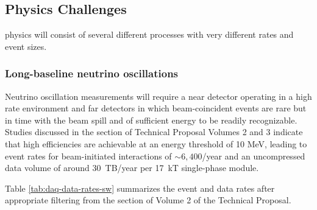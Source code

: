 
\subsection{Physics Challenges}

  physics will consist of several different processes with very different rates and event sizes. 


\subsubsection{Long-baseline neutrino oscillations} Neutrino oscillation measurements will require a near detector operating in a high rate environment and far detectors in which beam-coincident events are rare but in time with the beam spill and of sufficient energy to be readily recognizable.  Studies discussed in the  section of  Technical Proposal Volumes 2 and 3 indicate that high efficiencies are achievable at an energy threshold of 10 MeV, leading to event rates for beam-initiated  interactions of $\sim 6,400$/year and an uncompressed data volume of around 30~TB/year per 17~kT single-phase module. 


Table \ref{tab:daq-data-rates-sw} summarizes the event and data rates after appropriate filtering from the   section of Volume 2 of the Technical Proposal.

